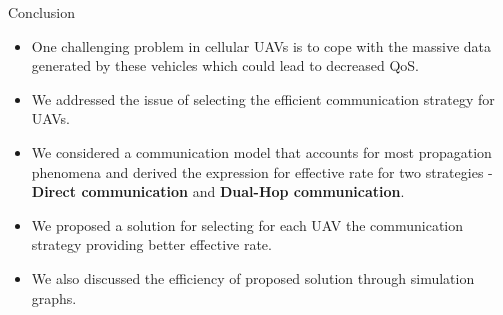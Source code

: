 \documentclass{beamer}
\begin{document}
\begin{frame}{Conclusion}
\begin{itemize}
    \item One challenging problem in cellular UAVs is to cope with the massive data generated by these vehicles which could lead to decreased QoS.
    \item We addressed the issue of selecting the efficient communication strategy for UAVs.
    \item We considered a communication model that accounts for most propagation phenomena and derived the expression for effective rate for two strategies - \textbf{Direct communication} and \textbf{Dual-Hop communication}.
    \item We proposed a solution for selecting for each UAV the communication strategy providing better effective rate.
    \item We also discussed the efficiency of proposed solution through simulation graphs.
\end{itemize}
\end{frame}
\end{document}
